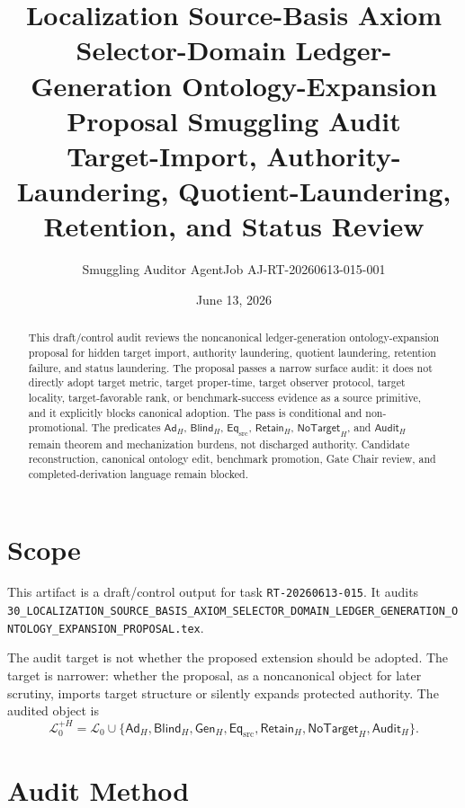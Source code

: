 \documentclass[11pt]{article}
\title{\textbf{Localization Source-Basis Axiom Selector-Domain Ledger-Generation Ontology-Expansion Proposal Smuggling Audit}\\[0.35em]
\large Target-Import, Authority-Laundering, Quotient-Laundering, Retention, and Status Review}
\author{Smuggling Auditor AgentJob AJ-RT-20260613-015-001}
\date{June 13, 2026}
\newcommand{\Lang}{\mathcal{L}_{0}}
\newcommand{\LangPlus}{\mathcal{L}_{0}^{+H}}
\newcommand{\AdH}{\mathsf{Ad}_{H}}
\newcommand{\BlindH}{\mathsf{Blind}_{H}}
\newcommand{\GenH}{\mathsf{Gen}_{H}}
\newcommand{\EqSrc}{\mathsf{Eq}_{\mathrm{src}}}
\newcommand{\RetainH}{\mathsf{Retain}_{H}}
\newcommand{\NoTargetH}{\mathsf{NoTarget}_{H}}
\newcommand{\AuditH}{\mathsf{Audit}_{H}}
\begin{document}
\maketitle

\begin{abstract}
This draft/control audit reviews the noncanonical ledger-generation
ontology-expansion proposal for hidden target import, authority laundering,
quotient laundering, retention failure, and status laundering. The proposal
passes a narrow surface audit: it does not directly adopt target metric,
target proper-time, target observer protocol, target locality,
target-favorable rank, or benchmark-success evidence as a source primitive,
and it explicitly blocks canonical adoption. The pass is conditional and
non-promotional. The predicates \(\AdH\), \(\BlindH\), \(\EqSrc\),
\(\RetainH\), \(\NoTargetH\), and \(\AuditH\) remain theorem and
mechanization burdens, not discharged authority. Candidate reconstruction,
canonical ontology edit, benchmark promotion, Gate Chair review, and
completed-derivation language remain blocked.
\end{abstract}

\section{Scope}

This artifact is a draft/control output for task \texttt{RT-20260613-015}.
It audits
\texttt{30\_LOCALIZATION\_SOURCE\_BASIS\_AXIOM\_SELECTOR\_DOMAIN\_LEDGER\_GENERATION\_ONTOLOGY\_EXPANSION\_PROPOSAL.tex}.

The audit target is not whether the proposed extension should be adopted.
The target is narrower: whether the proposal, as a noncanonical object for
later scrutiny, imports target structure or silently expands protected
authority. The audited object is
\[
    \LangPlus =
    \Lang \cup
    \{\AdH,\BlindH,\GenH,\EqSrc,\RetainH,\NoTargetH,\AuditH\}.
\]

\section{Audit Method}
\end{document}
